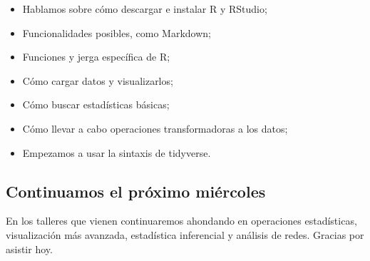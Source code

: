 \documentclass[
]{article}
\providecommand{\tightlist}{%
  \setlength{\itemsep}{0pt}\setlength{\parskip}{0pt}}
\begin{document}
\begin{itemize}
\tightlist
\item
  Hablamos sobre cómo descargar e instalar R y RStudio;
\item
  Funcionalidades posibles, como Markdown;
\item
  Funciones y jerga específica de R;
\item
  Cómo cargar datos y visualizarlos;
\item
  Cómo buscar estadísticas básicas;
\item
  Cómo llevar a cabo operaciones transformadoras a los datos;
\item
  Empezamos a usar la sintaxis de tidyverse.
\end{itemize}

\subsection{Continuamos el próximo
miércoles}\label{continuamos-el-pruxf3ximo-miuxe9rcoles}

En los talleres que vienen continuaremos ahondando en operaciones
estadísticas, visualización más avanzada, estadística inferencial y
análisis de redes. Gracias por asistir hoy.
\end{document}
